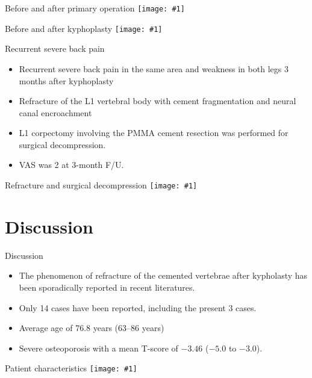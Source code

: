 \documentclass{beamer}
\newcommand*{\solo}[1]{\centering\texttt{[image: \#1]}}
\begin{document}
\begin{frame}{Before and after primary operation}
    \solo{F3a.jpg} 
\end{frame}

\begin{frame}{Before and after kyphoplasty}
    \solo{F3c.jpg} 
\end{frame}

\begin{frame}{Recurrent severe back pain}
    \begin{itemize}
        \item Recurrent severe back pain in the same area and weakness in both
              legs 3 months after kyphoplasty
        \item Refracture of the L1 vertebral body with cement fragmentation
              and neural canal encroachment
        \item L1 corpectomy involving the PMMA cement resection was performed
              for surgical decompression.
        \item VAS was 2 at 3-month F/U.
    \end{itemize}
\end{frame}

\begin{frame}{Refracture and surgical decompression}
    \solo{F3e.jpg} 
\end{frame}

\section{Discussion}
\begin{frame}{Discussion}
    \begin{itemize}
        \item The phenomenon of refracture of the cemented vertebrae after
              kypholasty has been sporadically reported in recent literatures.
        \item Only 14 cases have been reported, including the present 3 cases.
        \item Average age of 76.8 years (63--86 years)
        \item Severe osteoporosis with a mean T-score of $-3.46$ ($-5.0$ to $-3.0$).
    \end{itemize}
\end{frame}

\begin{frame}{Patient characteristics}
    \solo{T1.pdf}
\end{frame}
\end{document}
